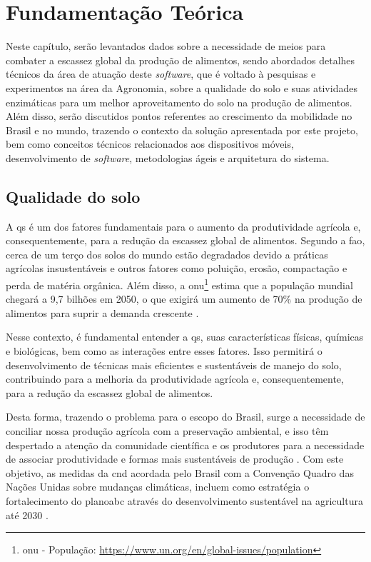 \chapter{Fundamentação Teórica}\label{ch:teoria}
Neste capítulo, serão levantados dados sobre a necessidade de meios para combater a escassez global da produção de alimentos, sendo abordados detalhes técnicos da área de atuação deste \textit{software}, que é voltado à pesquisas e experimentos na área da Agronomia, sobre a qualidade do solo e suas atividades enzimáticas para um melhor aproveitamento do solo na produção de alimentos. Além disso, serão discutidos pontos referentes ao crescimento da mobilidade no Brasil e no mundo, trazendo o contexto da solução apresentada por este projeto, bem como conceitos técnicos relacionados aos dispositivos móveis, desenvolvimento de \textit{software}, metodologias ágeis e arquitetura do sistema.

\section{Qualidade do solo}\label{sec:qualidade_solo}
A \ac{qs} é um dos fatores fundamentais para o aumento da produtividade agrícola e, consequentemente, para a redução da escassez global de alimentos. Segundo a \ac{fao}, cerca de um terço dos solos do mundo estão degradados devido a práticas agrícolas insustentáveis e outros fatores como poluição, erosão, compactação e perda de matéria orgânica. Além disso, a \ac{onu}\footnote{\ac{onu} - População: \url{https://www.un.org/en/global-issues/population}} estima que a população mundial chegará a 9,7 bilhões em 2050, o que exigirá um aumento de 70\% na produção de alimentos para suprir a demanda crescente \citet{fao2018future}.

Nesse contexto, é fundamental entender a \ac{qs}, suas características físicas, químicas e biológicas, bem como as interações entre esses fatores. Isso permitirá o desenvolvimento de técnicas mais eficientes e sustentáveis de manejo do solo, contribuindo para a melhoria da produtividade agrícola e, consequentemente, para a redução da escassez global de alimentos.

Desta forma, trazendo o problema para o escopo do Brasil, surge a necessidade de conciliar nossa produção agrícola com a preservação ambiental, e isso têm despertado a atenção da comunidade científica e os produtores para a necessidade de associar produtividade e formas mais sustentáveis de produção \citet{lopez2019carbon}. Com este objetivo, as medidas da \ac{cnd} acordada pelo Brasil com a Convenção Quadro das Nações Unidas sobre mudanças climáticas, incluem como estratégia o fortalecimento do \ac{planoabc} através do desenvolvimento sustentável na agricultura até 2030 \citet{embrapa_visao_2030}.

